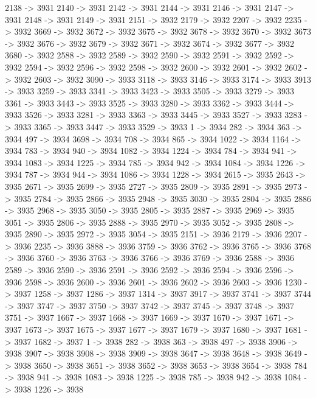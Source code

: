 {	2138 -> 3931
	2140 -> 3931
	2142 -> 3931
	2144 -> 3931
	2146 -> 3931
	2147 -> 3931
	2148 -> 3931
	2149 -> 3931
	2151 -> 3932
	2179 -> 3932
	2207 -> 3932
	2235 -> 3932
	3669 -> 3932
	3672 -> 3932
	3675 -> 3932
	3678 -> 3932
	3670 -> 3932
	3673 -> 3932
	3676 -> 3932
	3679 -> 3932
	3671 -> 3932
	3674 -> 3932
	3677 -> 3932
	3680 -> 3932
	2588 -> 3932
	2589 -> 3932
	2590 -> 3932
	2591 -> 3932
	2592 -> 3932
	2594 -> 3932
	2596 -> 3932
	2598 -> 3932
	2600 -> 3932
	2601 -> 3932
	2602 -> 3932
	2603 -> 3932
	3090 -> 3933
	3118 -> 3933
	3146 -> 3933
	3174 -> 3933
	3913 -> 3933
	3259 -> 3933
	3341 -> 3933
	3423 -> 3933
	3505 -> 3933
	3279 -> 3933
	3361 -> 3933
	3443 -> 3933
	3525 -> 3933
	3280 -> 3933
	3362 -> 3933
	3444 -> 3933
	3526 -> 3933
	3281 -> 3933
	3363 -> 3933
	3445 -> 3933
	3527 -> 3933
	3283 -> 3933
	3365 -> 3933
	3447 -> 3933
	3529 -> 3933
	1 -> 3934
	282 -> 3934
	363 -> 3934
	497 -> 3934
	3698 -> 3934
	708 -> 3934
	865 -> 3934
	1022 -> 3934
	1164 -> 3934
	783 -> 3934
	940 -> 3934
	1082 -> 3934
	1224 -> 3934
	784 -> 3934
	941 -> 3934
	1083 -> 3934
	1225 -> 3934
	785 -> 3934
	942 -> 3934
	1084 -> 3934
	1226 -> 3934
	787 -> 3934
	944 -> 3934
	1086 -> 3934
	1228 -> 3934
	2615 -> 3935
	2643 -> 3935
	2671 -> 3935
	2699 -> 3935
	2727 -> 3935
	2809 -> 3935
	2891 -> 3935
	2973 -> 3935
	2784 -> 3935
	2866 -> 3935
	2948 -> 3935
	3030 -> 3935
	2804 -> 3935
	2886 -> 3935
	2968 -> 3935
	3050 -> 3935
	2805 -> 3935
	2887 -> 3935
	2969 -> 3935
	3051 -> 3935
	2806 -> 3935
	2888 -> 3935
	2970 -> 3935
	3052 -> 3935
	2808 -> 3935
	2890 -> 3935
	2972 -> 3935
	3054 -> 3935
	2151 -> 3936
	2179 -> 3936
	2207 -> 3936
	2235 -> 3936
	3888 -> 3936
	3759 -> 3936
	3762 -> 3936
	3765 -> 3936
	3768 -> 3936
	3760 -> 3936
	3763 -> 3936
	3766 -> 3936
	3769 -> 3936
	2588 -> 3936
	2589 -> 3936
	2590 -> 3936
	2591 -> 3936
	2592 -> 3936
	2594 -> 3936
	2596 -> 3936
	2598 -> 3936
	2600 -> 3936
	2601 -> 3936
	2602 -> 3936
	2603 -> 3936
	1230 -> 3937
	1258 -> 3937
	1286 -> 3937
	1314 -> 3937
	3917 -> 3937
	3741 -> 3937
	3744 -> 3937
	3747 -> 3937
	3750 -> 3937
	3742 -> 3937
	3745 -> 3937
	3748 -> 3937
	3751 -> 3937
	1667 -> 3937
	1668 -> 3937
	1669 -> 3937
	1670 -> 3937
	1671 -> 3937
	1673 -> 3937
	1675 -> 3937
	1677 -> 3937
	1679 -> 3937
	1680 -> 3937
	1681 -> 3937
	1682 -> 3937
	1 -> 3938
	282 -> 3938
	363 -> 3938
	497 -> 3938
	3906 -> 3938
	3907 -> 3938
	3908 -> 3938
	3909 -> 3938
	3647 -> 3938
	3648 -> 3938
	3649 -> 3938
	3650 -> 3938
	3651 -> 3938
	3652 -> 3938
	3653 -> 3938
	3654 -> 3938
	784 -> 3938
	941 -> 3938
	1083 -> 3938
	1225 -> 3938
	785 -> 3938
	942 -> 3938
	1084 -> 3938
	1226 -> 3938
}
